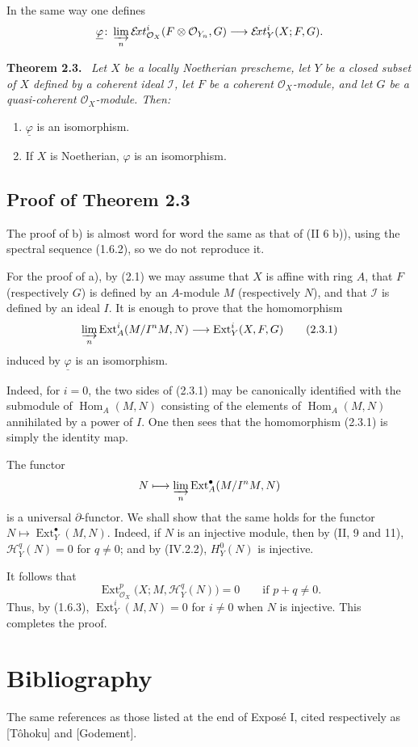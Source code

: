 \documentclass[11pt,a4paper]{article}
\newcommand{\OX}{\mathcal O_X}
\newcommand{\OY}[1]{\mathcal O_{Y_{#1}}}
\newcommand{\SheafI}{\mathcal I}
\newcommand{\Ext}{\operatorname{Ext}}
\newcommand{\Homop}{\operatorname{Hom}}
\newcommand{\SheafExt}{\mathcal E\!xt}
\newcommand{\SheafH}{\mathcal H}
\newcommand{\Sheafphi}{\underline{\varphi}}
\newenvironment{sgastatement}[1]{\par\addvspace{0.8\baselineskip}\noindent\textbf{#1.}\ \itshape}{\par}
\begin{document}
In the same way one defines
\[
 \Sheafphi\colon
 \varinjlim_n \SheafExt_{\OX}^{i}(F\otimes\OY{n},G)
 \longrightarrow \SheafExt_Y^{i}(X;F,G).
\]

\begin{sgastatement}{Theorem 2.3}
Let $X$ be a locally Noetherian prescheme, let $Y$ be a closed subset of $X$
defined by a coherent ideal $\SheafI$, let $F$ be a coherent $\OX$-module,
and let $G$ be a quasi-coherent $\OX$-module. Then:
\begin{enumerate}
 \renewcommand{\labelenumi}{\alph{enumi})}
 \item $\Sheafphi$ is an isomorphism.
 \item If $X$ is Noetherian, $\varphi$ is an isomorphism.
\end{enumerate}
\end{sgastatement}

\subsection*{Proof of Theorem 2.3}
The proof of b) is almost word for word the same as that of
\textup{(II 6 b))}, using the spectral sequence (1.6.2), so we do not reproduce
it.

For the proof of a), by (2.1) we may assume that $X$ is affine with ring $A$,
that $F$ (respectively $G$) is defined by an $A$-module $M$ (respectively
$N$), and that $\SheafI$ is defined by an ideal $I$. It is enough to prove
that the homomorphism
\begin{equation}
 \varinjlim_n \Ext_A^i(M/I^nM,N)
 \longrightarrow \Ext_Y^i(X,F,G)
 \tag{2.3.1}
\end{equation}
induced by $\Sheafphi$ is an isomorphism.

Indeed, for $i=0$, the two sides of (2.3.1) may be canonically identified with
the submodule of $\Homop_A(M,N)$ consisting of the elements of
$\Homop_A(M,N)$ annihilated by a power of $I$. One then sees that the
homomorphism (2.3.1) is simply the identity map.

The functor
\[
 N\longmapsto \varinjlim_n \Ext_A^{\bullet}(M/I^nM,N)
\]
is a universal $\partial$-functor. We shall show that the same holds for the
functor $N\longmapsto \Ext_Y^{\bullet}(M,N)$. Indeed, if $N$ is an injective
module, then by \textup{(II, 9 and 11)}, $\SheafH_Y^q(N)=0$ for $q\ne0$; and
by \textup{(IV.2.2)}, $H_Y^0(N)$ is injective.

It follows that
\[
 \Ext_{\OX}^{p}\bigl(X;M,\SheafH_Y^q(N)\bigr)=0
 \qquad\text{if }p+q\ne0.
\]
Thus, by (1.6.3), $\Ext_Y^i(M,N)=0$ for $i\ne0$ when $N$ is injective. This
completes the proof.

\section*{Bibliography}
The same references as those listed at the end of Expos\'e I, cited
respectively as [T\^ohoku] and [Godement].
\end{document}
